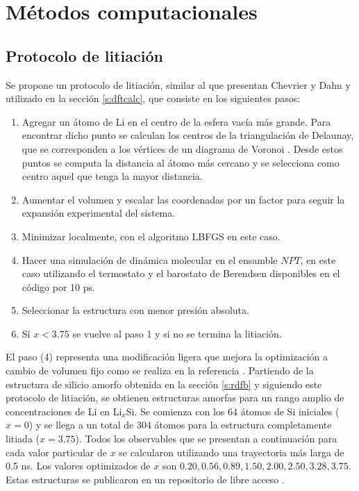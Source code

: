 \section{Métodos computacionales}

\subsection{Protocolo de litiación}\label{s:litpro}

Se propone un protocolo de litiación, similar al que presentan Chevrier y Dahn
\cite{chevrier2009} y utilizado en la sección \ref{s:dftcalc}, que consiste 
en los siguientes pasos:
\begin{enumerate}
    \item Agregar un átomo de Li en el centro de la esfera vacía más grande.
        Para encontrar dicho punto se calculan los centros de la triangulación 
        de Delaunay, que se corresponden a los vértices de un diagrama de 
        Voronoi \cite{aurenhammer1991}. Desde estos puntos se computa la 
        distancia al átomo más cercano y se selecciona como centro aquel que 
        tenga la mayor distancia. 
    \item Aumentar  el volumen y escalar las coordenadas por un factor para
        seguir la expansión experimental del sistema.
    \item Minimizar localmente, con el algoritmo LBFGS en este caso.
    \item Hacer una simulación de dinámica molecular en el ensamble $NPT$, en 
        este caso utilizando el termostato y el barostato de Berendsen \cite{berendsen1984} 
        disponibles en el código  \cite{dftb+} por 10 ps. 
    \item Seleccionar la estructura con menor presión absoluta.
    \item Si $x < 3.75$ se vuelve al paso 1 y si no se termina la litiación.
\end{enumerate}
El paso (4) representa una modificación ligera que mejora la optimización a 
cambio de volumen fijo como se realiza en la referencia \cite{chevrier2009}.
Partiendo de la estructura de silicio amorfo obtenida en la sección 
\ref{s:rdfb} y siguiendo este protocolo de litiación, se obtienen estructuras
amorfas para un rango amplio de concentraciones de Li en Li$_x$Si. Se comienza
con los 64 átomos de Si iniciales ($x=0$) y se llega a un total de 304 átomos
para la estructura completamente litiada ($x=3.75$). Todos los observables que
se presentan a continuación para cada valor particular de $x$ se calcularon 
utilizando una trayectoria más larga de 0.5 ns. Los valores optimizados de $x$
son $0.20, 0.56, 0.89, 1.50, 2.00, 2.50, 3.28, 3.75$. Estas estructuras se 
publicaron en un repositorio de libre acceso \cite{dftb_lisi_amorphous}.
